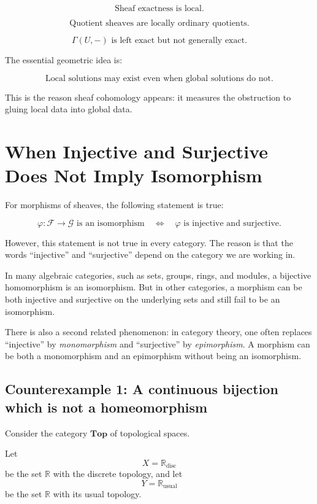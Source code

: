 \documentclass[12pt,a4paper]{article}
\theoremstyle{notespace}
\begin{document}
\[
\boxed{
	\text{Sheaf exactness is local.}
}
\]

\[
\boxed{
	\text{Quotient sheaves are locally ordinary quotients.}
}
\]

\[
\boxed{
	\Gamma(U,-)\text{ is left exact but not generally exact.}
}
\]

The essential geometric idea is:

\[
\boxed{
	\text{Local solutions may exist even when global solutions do not.}
}
\]

This is the reason sheaf cohomology appears: it measures the obstruction to gluing local data into global data.


\section{When Injective and Surjective Does Not Imply Isomorphism}

For morphisms of sheaves, the following statement is true:

\[
\varphi:\mathcal F\to \mathcal G
\text{ is an isomorphism}
\quad\Longleftrightarrow\quad
\varphi
\text{ is injective and surjective}.
\]

However, this statement is not true in every category. The reason is that the words
``injective'' and ``surjective'' depend on the category we are working in.

In many algebraic categories, such as sets, groups, rings, and modules, a bijective homomorphism is an isomorphism. But in other categories, a morphism can be both injective and surjective on the underlying sets and still fail to be an isomorphism.

There is also a second related phenomenon: in category theory, one often replaces ``injective'' by \emph{monomorphism} and ``surjective'' by \emph{epimorphism}. A morphism can be both a monomorphism and an epimorphism without being an isomorphism.

\subsection{Counterexample 1: A continuous bijection which is not a homeomorphism}

Consider the category \(\mathbf{Top}\) of topological spaces.

Let
\[
X=\mathbb R_{\mathrm{disc}}
\]
be the set \(\mathbb R\) with the discrete topology, and let
\[
Y=\mathbb R_{\mathrm{usual}}
\]
be the set \(\mathbb R\) with its usual topology.
\end{document}
